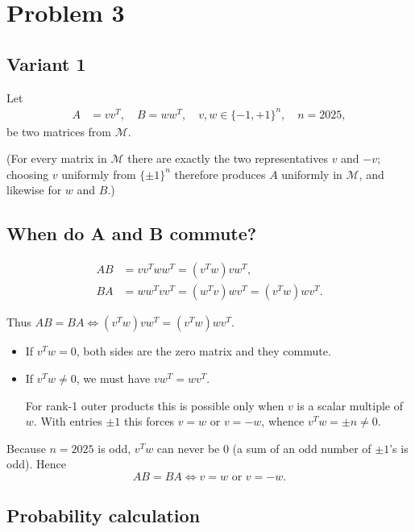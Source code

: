 \documentclass[12pt,a4paper]{article}
\theoremstyle{definition}
\begin{document}
    \newpage

    \section{Problem 3}

    \subsection{Variant 1}
        Let
        \begin{align}
            A &= vv^T, \quad B = ww^T, \quad v, w \in \{-1, +1\}^n, \quad n = 2025,
        \end{align}
        be two matrices from $\mathcal{M}$.

        (For every matrix in $\mathcal{M}$ there are exactly the two representatives $v$ and $-v$; choosing $v$ uniformly from $\{\pm 1\}^n$ therefore produces $A$ uniformly in $\mathcal{M}$, and likewise for $w$ and $B$.)

        \subsection*{When do A and B commute?}

        \begin{align}
            AB &= vv^T ww^T = (v^T w) v w^T, \\
            BA &= ww^T vv^T = (w^T v) w v^T = (v^T w) w v^T.
        \end{align}

        Thus $AB = BA \iff (v^T w) v w^T = (v^T w) w v^T$.

        \begin{itemize}
            \item If $v^T w = 0$, both sides are the zero matrix and they commute.
            \item If $v^T w \neq 0$, we must have $v w^T = w v^T$.

            For rank-1 outer products this is possible only when $v$ is a scalar multiple of $w$. With entries $\pm 1$ this forces $v = w$ or $v = -w$, whence $v^T w = \pm n \neq 0$.
        \end{itemize}

        Because $n = 2025$ is odd, $v^T w$ can never be 0 (a sum of an odd number of $\pm 1$'s is odd). Hence
        \[
            AB = BA \iff v = w \text{ or } v = -w.
        \]

        \subsection*{Probability calculation}
\end{document}
